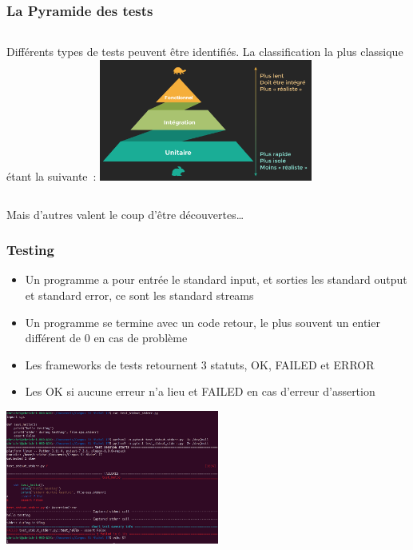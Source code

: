 \documentclass{beamer}
\begin{document}
    \begin{frame}
        \transdissolve
        \frametitle{La Pyramide des tests}
        \begin{columns}
            Différents types de tests peuvent être identifiés.
            La classification la plus classique étant la suivante\footnotemark~:
            \centering
            \includegraphics[width=7cm]{image/classic-test-pyramid.png}
        \end{columns}
        \bigbreak
        Mais d'autres valent le coup d'être découvertes\ldots

    \end{frame}

    \begin{frame}
        \transdissolve
        \frametitle{Testing}

        \begin{itemize}

            \item Un programme a pour entrée le standard input, et sorties les standard output et standard error, ce sont les standard streams
            \item Un programme se termine avec un code retour, le plus souvent un entier différent de 0 en cas de problème
            \item Les frameworks de tests retournent 3 statuts, OK, FAILED et ERROR
            \item Les OK si aucune erreur n'a lieu et FAILED en cas d'erreur d'assertion

        \end{itemize}

        \bigbreak

        \centering
        \includegraphics[width=7cm]{image/terminal-test-report.png}

    \end{frame}
\end{document}

